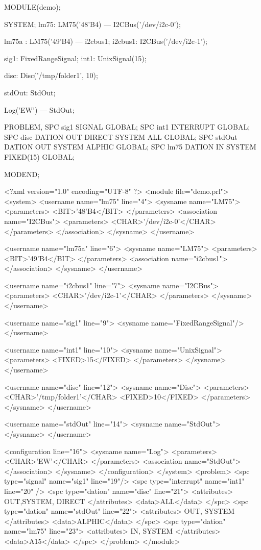 \begin{PEARLCode}
MODULE(demo);

SYSTEM;
lm75: LM75('48'B4) --- I2CBus('/dev/i2c-0');

lm75a : LM75('49'B4) --- i2cbus1;
i2cbus1: I2CBus('/dev/i2c-1');

sig1: FixedRangeSignal;
int1: UnixSignal(15);

disc: Disc('/tmp/folder1', 10);

stdOut: StdOut;

Log('EW') --- StdOut;

PROBLEM,
SPC sig1 SIGNAL GLOBAL;
SPC int1 INTERRUPT GLOBAL;
SPC disc DATION OUT DIRECT SYSTEM ALL GLOBAL;
SPC stdOut DATION OUT SYSTEM ALPHIC GLOBAL;
SPC lm75 DATION IN SYSTEM FIXED(15) GLOBAL;

MODEND;
\end{PEARLCode}

\begin{XMLCode}
<?xml version="1.0" encoding="UTF-8" ?>
<module file="demo.prl">
<system>
   <username name="lm75" line="4">
      <sysname name="LM75">
      <parameters>
         <BIT>'48'B4</BIT>
      </parameters>
      <association name="I2CBus">
         <parameters>
            <CHAR>'/dev/i2c-0'</CHAR>
         </parameters>
      </association>
   </sysname>
</username>

<username name="lm75a" line="6">
   <sysname name="LM75">
      <parameters>
         <BIT>'49'B4</BIT>
      </parameters>
      <association name="i2cbus1">
      </association>
   </sysname>
</username>

<username name="i2cbus1" line="7">
   <sysname name="I2CBus">
      <parameters>
         <CHAR>'/dev/i2c-1'</CHAR>
      </parameters>
   </sysname>
</username>

<username name="sig1" line="9">
   <sysname name="FixedRangeSignal"/>
</username>

<username name="int1" line="10">
   <sysname name="UnixSignal">
      <parameters>
         <FIXED>15</FIXED>
      </parameters>
   </sysname>
</username>

<username name="disc" line="12">
   <sysname name="Disc">
      <parameters>
         <CHAR>'/tmp/folder1'</CHAR>
         <FIXED>10</FIXED>
      </parameters>
   </sysname>
</username>

<username name="stdOut" line="14">
   <sysname name="StdOut">
   </sysname>
</username> 

<configuration line="16">
   <sysname name="Log">
      <parameters>
         <CHAR>'EW'</CHAR>
      </parameters>
      <association name="StdOut">
      </association>
   </sysname>
</configuration>
</system>
<problem>
<spc type="signal" name="sig1" line="19"/>
<spc type="interrupt" name="int1" line="20" />
<spc type="dation" name="disc" line="21">
   <attributes> OUT,SYSTEM, DIRECT </attributes>
   <data>ALL</data>
</spc>
<spc type="dation" name="stdOut" line="22">
      <attributes> OUT, SYSTEM </attributes>
      <data>ALPHIC</data>
</spc>
<spc type="dation" name="lm75" line="23">
      <attributes> IN, SYSTEM </attributes>
      <data>A15</data>
</spc>
</problem>
</module>
\end{XMLCode}

